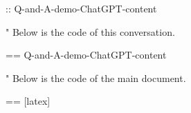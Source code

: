 \documentclass[%
  use theme = ChatGPT-light,
  scroll,
]{Q-and-A}
\begin{document}
:: {Q-and-A-demo-ChatGPT-content}

"
  Below is the code of this conversation.

  == {Q-and-A-demo-ChatGPT-content}

"
  Below is the code of the main document.

  == [latex] {\jobname}
\end{document}
